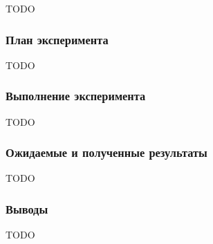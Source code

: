 TODO

\subsubsection*{План эксперимента}

TODO

\subsubsection*{Выполнение эксперимента}

TODO

\subsubsection*{Ожидаемые и полученные результаты}

TODO

\subsubsection*{Выводы}

TODO

\clearpage
\newpage